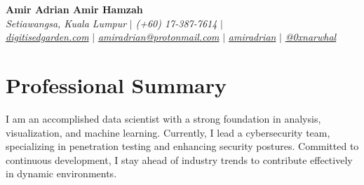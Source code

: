 \documentclass[letterpaper,10pt]{article}
\newcommand{\sectionspace}{
	\vspace{-20pt}
}
\begin{document}
	
	
	\begin{flushleft}
		\textbf{\large Amir Adrian Amir Hamzah} \\    
		\textit{ Setiawangsa, Kuala Lumpur} $|$ 
		\textit{ (+60) 17-387-7614} $|$  \\	
		\href{https://digitisedgarden.com}{{\textit{ digitisedgarden.com}}} $|$
		\href{mailto:amiradrian@protonmail.com}{{\textit{ amiradrian@protonmail.com}}} $|$ 
		\href{https://linkedin.com/in/amiradrian}{{\textit{ amiradrian}}} $|$
		\href{https://github.com/0xnarwhal}{{\textit{ @0xnarwhal}}}
		\vspace{-8pt}
	\end{flushleft}
	
	
	\section{Professional Summary}
	\vspace{-3pt}
	\begin{itemize}[leftmargin=0.15in, label={}]
		{\item{
				{I am an accomplished data scientist with a strong foundation in analysis, visualization, and machine learning. Currently, I lead a cybersecurity team, specializing in penetration testing and enhancing security postures. Committed to continuous development, I stay ahead of industry trends to contribute effectively in dynamic environments.} \\      
		}}
	\end{itemize}
	\sectionspace
	
	
\end{document}
